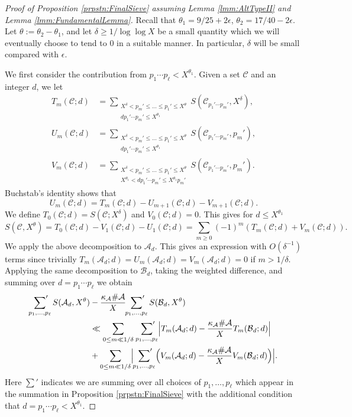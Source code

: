 \documentclass[10pt]{amsart}
\theoremstyle{plain}
\numberwithin{sblmm}{thrm}
\numberwithin{equation}{section}
\begin{document}
\begin{proof}[Proof of Proposition \ref{prpstn:FinalSieve} assuming Lemma \ref{lmm:AltTypeII} and Lemma \ref{lmm:FundamentalLemma}]
%
Recall that $\theta_1=9/25+2\epsilon$, $\theta_2=17/40-2\epsilon$. Let $\theta:=\theta_2-\theta_1$, and let $\delta\ge 1/\log\log{X}$ be a small quantity which we will eventually choose to tend to 0 in a suitable manner. In particular, $\delta$ will be small compared with $\epsilon$. 

We first consider the contribution from $p_1\cdots p_\ell < X^{\theta_1}$. %
%
Given a set $\mathcal{C}$ and an integer $d$, we let
%
\begin{align*}
T_m(\mathcal{C};d)&=\sum_{\substack{X^{\delta}<p_m'\le \dots \le p_1'\le X^{\theta}\\ d p_1'\cdots p_m'\le X^{\theta_1}}}S(\mathcal{C}_{p_1'\cdots p_m'},X^{\delta}),\\
U_m(\mathcal{C};d)&=\sum_{\substack{X^{\delta}<p_m'\le \dots \le p_1'\le X^{\theta} \\ d p_1'\cdots p_m'\le X^{\theta_1}}}S(\mathcal{C}_{p_1'\cdots p_m'},p_m'),\\
V_m(\mathcal{C};d)&=\sum_{\substack{X^{\delta}<p_m'\le \dots \le p_1'\le X^{\theta} \\ X^{\theta_1}<d p_1'\cdots p_m'\le X^{\theta_1}p_m' }}S(\mathcal{C}_{p_1'\cdots p_m'},p_m').
\end{align*}
%
Buchstab's identity shows that
\[
U_m(\mathcal{C};d)=T_m(\mathcal{C};d)-U_{m+1}(\mathcal{C};d)-V_{m+1}(\mathcal{C};d).
\]
 We define $T_0(\mathcal{C};d)=S(\mathcal{C};X^{\delta})$ and $V_0(\mathcal{C};d)=0$. This gives for $d\le X^{\theta_1}$
\[
S(\mathcal{C},X^{\theta})=T_0(\mathcal{C};d)-V_1(\mathcal{C};d)-U_1(\mathcal{C};d)=\sum_{m\ge 0}(-1)^m(T_m(\mathcal{C};d)+V_m(\mathcal{C};d)).
\]
We apply the above decomposition to $\mathcal{A}{}_d$. This gives an expression with $O(\delta^{-1})$ terms since trivially $T_m(\mathcal{A}{}_{d};d)=U_m(\mathcal{A}{}_{d};d)=V_m(\mathcal{A}{}_{d};d)=0$ if $m>1/\delta$. Applying the same decomposition to $\mathcal{B}{}_{d}$, taking the weighted difference, and summing over $d=p_1\cdots p_\ell$ we obtain
%
\begin{align}
\sideset{}{'}\sum_{p_1,\dots,p_\ell} S(\mathcal{A}{}_{d},X^{\theta})&-\frac{\kappa_\mathcal{A}\#\mathcal{A}{}}{X} \sideset{}{'}\sum_{p_1,\dots,p_\ell} S(\mathcal{B}{}_{d},X^{\theta})\nonumber\\
&\ll \sum_{0\le m\ll 1/\delta}\,\sideset{}{'}\sum_{p_1,\dots,p_\ell} \Bigl|T_m(\mathcal{A}{}_{d};d)-\frac{\kappa_\mathcal{A}\#\mathcal{A}{}}{X} T_m(\mathcal{B}{}_{d};d)\Bigr|\nonumber\\
&+\sum_{0\le m\ll 1/\delta}\Bigl|\sideset{}{'}\sum_{p_1,\dots,p_\ell} \Bigl(V_m(\mathcal{A}{}_{d};d)-\frac{\kappa_\mathcal{A}\#\mathcal{A}{}}{X} V_m(\mathcal{B}{}_{d};d)\Bigr)\Bigr|.
\label{eq:TmVmSplit}
\end{align}
%
Here $\sum'$ indicates we are summing over all choices of $p_1,\dots,p_\ell$ which appear in the summation in Proposition \ref{prpstn:FinalSieve} with the additional condition that $d=p_1\cdots p_\ell < X^{\theta_1}$.


\end{proof}
\end{document}
